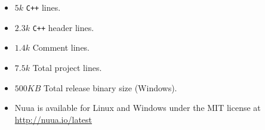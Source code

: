 \begin{slide}
    \begin{itemize}
        \item $5k$ \texttt{C++} lines.
        \item $2.3k$ \texttt{C++} header lines.
        \item $1.4k$ Comment lines.
        \item $7.5k$ Total project lines.
        \item $500KB$ Total release binary size (Windows).
        \item Nuua is available for Linux and Windows under the MIT license at \url{http://nuua.io/latest}
    \end{itemize}
\end{slide}
